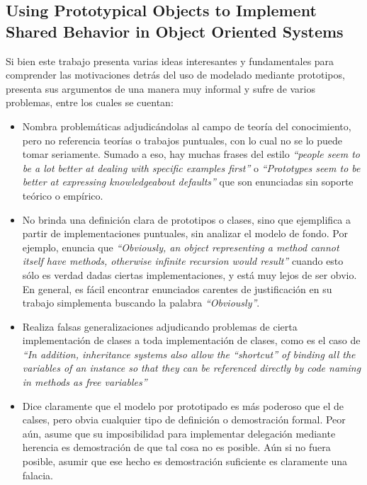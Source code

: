 \documentclass[a4paper,10pt]{article}
\begin{document}
\subsection{Using Prototypical Objects to Implement Shared Behavior in Object Oriented Systems}

Si bien este trabajo presenta varias ideas interesantes y fundamentales para comprender las motivaciones detrás del uso de modelado mediante prototipos, presenta sus argumentos de una manera muy informal y sufre de varios problemas, entre los cuales se cuentan:

\begin{itemize}
	\item Nombra problemáticas adjudicándolas al campo de teoría del conocimiento, pero no referencia teorías o trabajos puntuales, con lo cual no se lo puede tomar seriamente. Sumado a eso, hay muchas frases del estilo \textit{``people seem to be a lot better at dealing with specific examples first''} o \textit{``Prototypes seem to be better at expressing knowledgeabout defaults''} que son enunciadas sin soporte teórico o empírico.
	\item No brinda una definición clara de prototipos o clases, sino que ejemplifica a partir de implementaciones puntuales, sin analizar el modelo de fondo. Por ejemplo, enuncia que \textit{``Obviously, an object representing a method cannot itself have methods, otherwise infinite recursion would result''} cuando esto sólo es verdad dadas ciertas implementaciones, y está muy lejos de ser obvio. En general, es fácil encontrar enunciados carentes de justificación en su trabajo simplementa buscando la palabra \textit{``Obviously''}.
  \item Realiza falsas generalizaciones adjudicando problemas de cierta implementación de clases a toda implementación de clases, como es el caso de \textit{``In addition, inheritance systems also allow the “shortcut” of binding all the variables of an instance so that they can be referenced directly by code naming in methods as free variables''}
  \item Dice claramente que el modelo por prototipado es más poderoso que el de calses, pero obvia cualquier tipo de definición o demostración formal. Peor aún, asume que su imposibilidad para implementar delegación mediante herencia es demostración de que tal cosa no es posible. Aún si no fuera posible, asumir que ese hecho es demostración suficiente es claramente una falacia.
\end{itemize}
\end{document}
